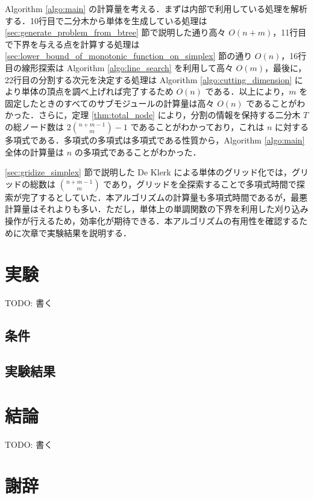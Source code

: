 \documentclass[a4paper,11pt]{jreport}
\begin{document}
Algorithm \ref{algo:main} の計算量を考える．まずは内部で利用している処理を解析する．10行目で二分木から単体を生成している処理は \ref{sec:generate_problem_from_btree} 節で説明した通り高々 $ O(n + m) $，11行目で下界を与える点を計算する処理は \ref{sec:lower_bound_of_monotonic_function_on_simplex} 節の通り $ O(n) $，16行目の線形探索は Algorithm \ref{algo:line_search} を利用して高々 $ O(m) $，最後に，22行目の分割する次元を決定する処理は Algorithm \ref{algo:cutting_dimension} により単体の頂点を調べ上げれば完了するため $ O(n) $ である．以上により，$ m $ を固定したときのすべてのサブモジュールの計算量は高々 $ O(n) $ であることがわかった．さらに，定理 \ref{thm:total_node} により，分割の情報を保持する二分木 $ T $ の総ノード数は $ 2 \binom{n + m - 1}{m} - 1 $ であることがわかっており，これは $ n $ に対する多項式である．多項式の多項式は多項式である性質から，Algorithm \ref{algo:main} 全体の計算量は $ n $ の多項式であることがわかった．\par
\ref{sec:gridize_simplex} 節で説明した De Klerk による単体のグリッド化では，グリッドの総数は $ \binom{n + m - 1}{m} $ であり，グリッドを全探索することで多項式時間で探索が完了するとしていた．本アルゴリズムの計算量も多項式時間であるが，最悪計算量はそれよりも多い．ただし，単体上の単調関数の下界を利用した刈り込み操作が行えるため，効率化が期待できる．本アルゴリズムの有用性を確認するために次章で実験結果を説明する．

\chapter{実験}

TODO: 書く
\section{条件}
\section{実験結果}

\chapter{結論}

TODO: 書く

\chapter*{謝辞}
\end{document}
